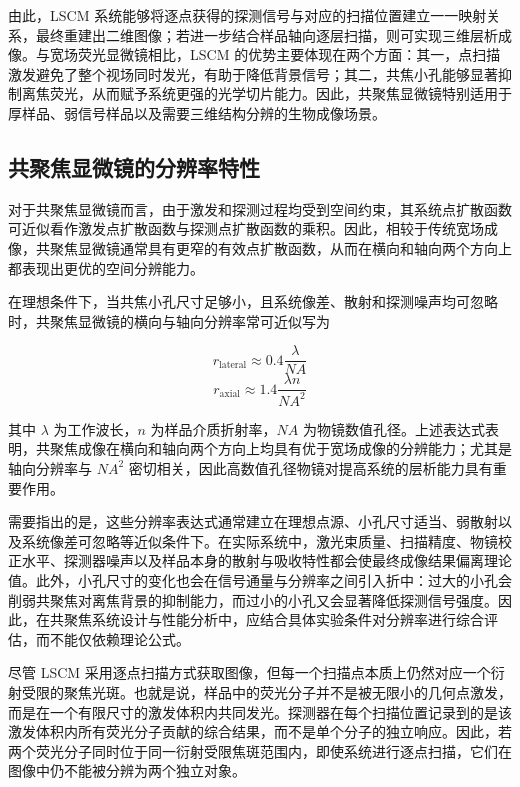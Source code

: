由此，LSCM 系统能够将逐点获得的探测信号与对应的扫描位置建立一一映射关系，最终重建出二维图像；若进一步结合样品轴向逐层扫描，则可实现三维层析成像。与宽场荧光显微镜相比，LSCM 的优势主要体现在两个方面：其一，点扫描激发避免了整个视场同时发光，有助于降低背景信号；其二，共焦小孔能够显著抑制离焦荧光，从而赋予系统更强的光学切片能力。因此，共聚焦显微镜特别适用于厚样品、弱信号样品以及需要三维结构分辨的生物成像场景。




\subsection{共聚焦显微镜的分辨率特性}\label{3.1.3}
对于共聚焦显微镜而言，由于激发和探测过程均受到空间约束，其系统点扩散函数可近似看作激发点扩散函数与探测点扩散函数的乘积。因此，相较于传统宽场成像，共聚焦显微镜通常具有更窄的有效点扩散函数，从而在横向和轴向两个方向上都表现出更优的空间分辨能力。

在理想条件下，当共焦小孔尺寸足够小，且系统像差、散射和探测噪声均可忽略时，共聚焦显微镜的横向与轴向分辨率常可近似写为

\begin{equation}
r_{\mathrm{lateral}}\approx 0.4\frac{\lambda}{NA}
\end{equation}
\begin{equation}
r_{\mathrm{axial}}\approx 1.4\frac{\lambda n}{NA^2}
\end{equation}

其中 $\lambda$ 为工作波长，$n$ 为样品介质折射率，$NA$ 为物镜数值孔径。上述表达式表明，共聚焦成像在横向和轴向两个方向上均具有优于宽场成像的分辨能力；尤其是轴向分辨率与 $NA^2$ 密切相关，因此高数值孔径物镜对提高系统的层析能力具有重要作用。

需要指出的是，这些分辨率表达式通常建立在理想点源、小孔尺寸适当、弱散射以及系统像差可忽略等近似条件下。在实际系统中，激光束质量、扫描精度、物镜校正水平、探测器噪声以及样品本身的散射与吸收特性都会使最终成像结果偏离理论值。此外，小孔尺寸的变化也会在信号通量与分辨率之间引入折中：过大的小孔会削弱共聚焦对离焦背景的抑制能力，而过小的小孔又会显著降低探测信号强度。因此，在共聚焦系统设计与性能分析中，应结合具体实验条件对分辨率进行综合评估，而不能仅依赖理论公式。

尽管 LSCM 采用逐点扫描方式获取图像，但每一个扫描点本质上仍然对应一个衍射受限的聚焦光斑。也就是说，样品中的荧光分子并不是被无限小的几何点激发，而是在一个有限尺寸的激发体积内共同发光。探测器在每个扫描位置记录到的是该激发体积内所有荧光分子贡献的综合结果，而不是单个分子的独立响应。因此，若两个荧光分子同时位于同一衍射受限焦斑范围内，即使系统进行逐点扫描，它们在图像中仍不能被分辨为两个独立对象。

